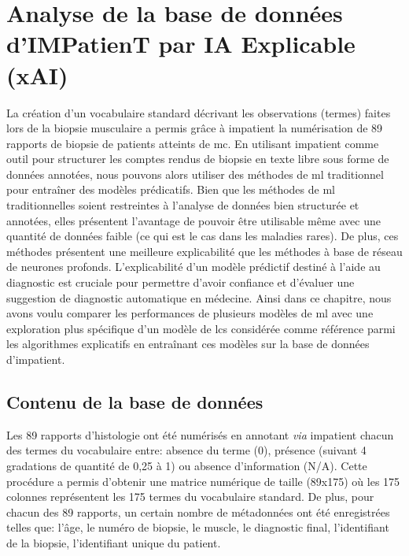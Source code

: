 \chapter{Analyse de la base de données d’IMPatienT par IA Explicable (xAI)}

La création d'un vocabulaire standard décrivant les observations (termes) faites lors de la biopsie musculaire a permis grâce à \gls{impatient} la numérisation de 89 rapports de biopsie de patients atteints de \gls{mc}. En utilisant \gls{impatient} comme outil pour structurer les comptes rendus de biopsie en texte libre sous forme de données annotées, nous pouvons alors utiliser des méthodes de \gls{ml} traditionnel pour entraîner des modèles prédicatifs. Bien que les méthodes de \gls{ml} traditionnelles soient restreintes à l'analyse de données bien structurée et annotées, elles présentent l'avantage de pouvoir être utilisable même avec une quantité de données faible (ce qui est le cas dans les maladies rares). De plus, ces méthodes présentent une meilleure explicabilité que les méthodes à base de réseau de neurones profonds. L'explicabilité d'un modèle prédictif destiné à l'aide au diagnostic est cruciale pour permettre d'avoir confiance et d'évaluer une suggestion de diagnostic automatique en médecine. Ainsi dans ce chapitre, nous avons voulu comparer les performances de plusieurs modèles de \gls{ml} avec une exploration plus spécifique d'un modèle de \gls{lcs} considérée comme référence parmi les algorithmes explicatifs en entraînant ces modèles sur la base de données d'\gls{impatient}.

\section{Contenu de la base de données}
Les 89 rapports d'histologie ont été numérisés en annotant \textit{via} \gls{impatient} chacun des termes du vocabulaire entre: absence du terme (0), présence (suivant 4 gradations de quantité de 0,25 à 1) ou absence d'information (N/A). Cette procédure a permis d'obtenir une matrice numérique de taille (89x175) où les 175 colonnes représentent les 175 termes du vocabulaire standard. De plus, pour chacun des 89 rapports, un certain nombre de métadonnées ont été enregistrées telles que: l'âge, le numéro de biopsie, le muscle, le diagnostic final, l'identifiant de la biopsie, l'identifiant unique du patient.
